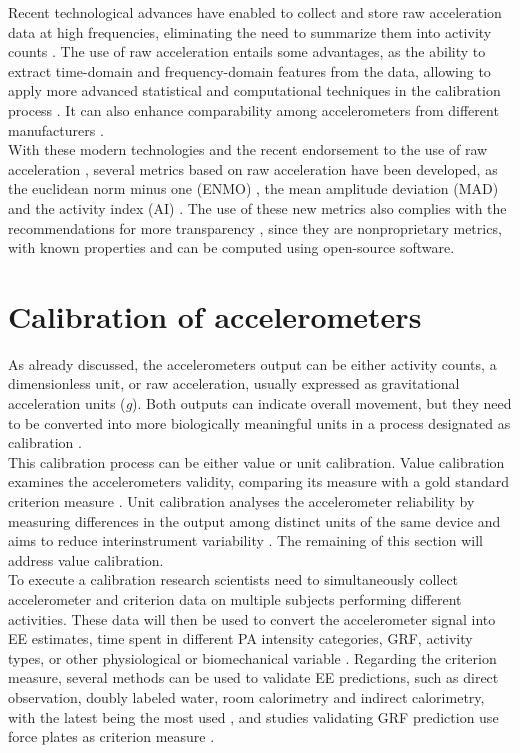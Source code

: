 \documentclass[11pt]{article}
\begin{document}
Recent technological advances have enabled to collect and store raw acceleration data at high frequencies, eliminating the need to summarize them into activity counts \cite{Bakrania_2016}. The use of raw acceleration entails some advantages, as the ability to extract time-domain and frequency-domain features from the data, allowing to apply more advanced statistical and computational techniques in the calibration process \cite{John_2013}. It can also enhance comparability among accelerometers from different manufacturers \cite{Mendes_2018, Rowlands_2016}. \\

With these modern technologies and the recent endorsement to the use of raw acceleration \cite{Freedson_2012}, several metrics based on raw acceleration have been developed, as the euclidean norm minus one (ENMO) \cite{vanHees_2013}, the mean amplitude deviation (MAD) \cite{Vaha-Ypya_2015} and the activity index (AI) \cite{Bai_2016}. The use of these new metrics also complies with the recommendations for more transparency \cite{Intille_2012}, since they are nonproprietary metrics, with known properties and can be computed using open-source software. \\

\section*{Calibration of accelerometers}

As already discussed, the accelerometers output can be either activity counts, a dimensionless unit, or raw acceleration, usually expressed as gravitational acceleration units (\textit{g}). Both outputs can indicate overall movement, but they need to be converted into more biologically meaningful units in a process designated as calibration \cite{Welk_2005}. \\

 This calibration process can be either value or unit calibration. Value calibration examines the accelerometers validity, comparing its measure with a gold standard criterion measure \cite{Basset_2012}. Unit calibration analyses the accelerometer reliability by measuring differences in the output among distinct units of the same device and aims to reduce interinstrument variability \cite{Welk_2005, Basset_2012}. The remaining of this section will address value calibration. \\

To execute a calibration research scientists need to simultaneously collect accelerometer and criterion data on multiple subjects performing different activities. These data will then be used to convert the accelerometer signal into EE estimates, time spent in different PA intensity categories, GRF, activity types, or other physiological or biomechanical variable \cite{Basset_2012}. Regarding the criterion measure, several methods can be used to validate EE predictions, such as direct observation, doubly labeled water, room calorimetry and indirect calorimetry, with the latest being the most used \cite{Basset_2012, Mendes_2018}, and studies validating GRF prediction use force plates as criterion measure \cite{Neugebauer_2018, Neugebauer_2014, Fortune_2014}. \\
\end{document}

